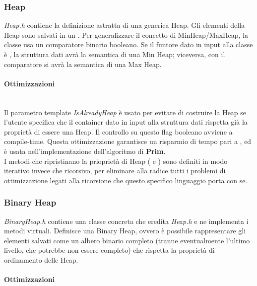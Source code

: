 \subsubsection{Heap}

\textit{Heap.h} contiene la definizione astratta di una generica Heap.
Gli elementi della Heap sono salvati in un .
Per generalizzare il concetto di MinHeap/MaxHeap, la classe usa un comparatore binario booleano. Se il funtore dato in input alla classe è
, la struttura dati avrà la semantica di una Min Heap; viceversa, con il comparatore  si avrà la semantica di una Max Heap.

\paragraph{Ottimizzazioni}\mbox{} \\

\noindent Il parametro template \textit{IsAlreadyHeap} è usato per evitare di costruire la Heap se l'utente specifica che il container dato in input alla struttura dati rispetta già la proprietà di essere una Heap. Il controllo su questo flag booleano avviene a compile-time. Questa ottimizzazione garantisce un risparmio di tempo pari a \complexityN{}, ed è usata nell'implementazione dell'algoritmo di \textbf{Prim}. \\

\noindent I metodi che ripristinano la prioprietà di Heap ( e ) sono definiti in modo iterativo invece che ricorsivo, per eliminare alla radice tutti i problemi di ottimizzazione legati alla ricorsione che questo specifico linguaggio porta con se.

\subsubsection{Binary Heap}

\textit{BinaryHeap.h} contiene una classe concreta che eredita \textit{Heap.h} e ne implementa i metodi virtuali. Definisce una Binary Heap, ovvero è possibile rappresentare gli elementi salvati come un albero binario completo (tranne eventualmente l'ultimo livello, che potrebbe non essere completo) che rispetta la proprietà di ordinamento delle Heap.

\paragraph{Ottimizzazioni}\mbox{} \\

